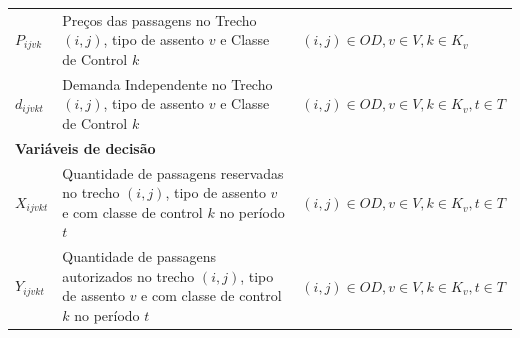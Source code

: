 \begin{table}[H]
\begin{tabular}{p{2cm} p{9.5cm} p{3.2cm}}
		$P_{ijvk}$         & Preços  das passagens no Trecho $(i,j)$, tipo de assento $v$ e Classe de Control $k$                                                                                                                                                                                                                                                                                                                                                    & $(i,j) \in OD,v \in V, k \in K_v$            \\
		$d_{ijvkt}$        & Demanda Independente no Trecho $(i,j)$, tipo de assento $v$ e Classe de Control $k$                                                                                                                                                                                                                                                                                                                                                   & $(i,j) \in OD,v \in V, k \in K_v, t \in T$   \\ \midrule
		\multicolumn{3}{l}{\textbf{Variáveis de decisão}}                                                                                                                                                                                                                                                                                                                                                                                                                                                 \\ \midrule
		$X_{ijvkt}$        & Quantidade de passagens reservadas no trecho $(i,j)$, tipo de assento $v$ e com classe de control $k$ no período $t$                                                                                                                                                                                                                                                                                                                    & $(i,j) \in OD, v \in V, k \in K_v, t \in T$  \\
		$Y_{ijvkt}$        & Quantidade de passagens autorizados no trecho $(i,j)$, tipo de assento $v$ e com classe de control $k$ no período $t$                                                                                                                                                                                                                                                                                                                   & $(i,j) \in OD, v \in V, k \in K_v, t \in T$  \\

\end{tabular}
\end{table}
